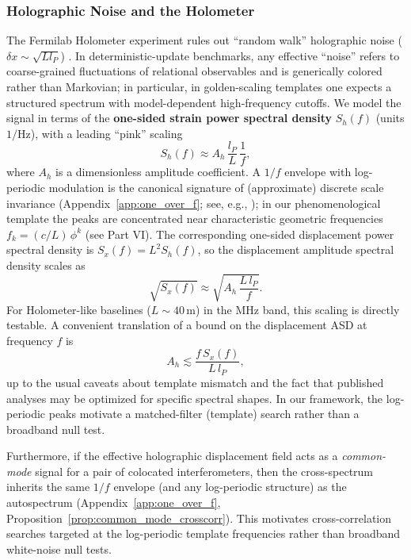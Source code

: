 \subsubsection{Holographic Noise and the Holometer}
The Fermilab Holometer experiment rules out ``random walk'' holographic noise ($\delta x \sim \sqrt{L l_P}$) \cite{Chou2016Holometer}. In deterministic-update benchmarks, any effective ``noise'' refers to coarse-grained fluctuations of relational observables and is generically colored rather than Markovian; in particular, in golden-scaling templates one expects a structured spectrum with model-dependent high-frequency cutoffs.
We model the signal in terms of the \textbf{one-sided strain power spectral density} $S_h(f)$ (units $1/\mathrm{Hz}$), with a leading ``pink'' scaling
\begin{equation}
    S_h(f) \approx A_h\,\frac{l_P}{L}\,\frac{1}{f},
\end{equation}
where $A_h$ is a dimensionless amplitude coefficient. A $1/f$ envelope with log-periodic modulation is the canonical signature of (approximate) discrete scale invariance (Appendix~\ref{app:one_over_f}; see, e.g., \cite{Sornette1998DSI}); in our phenomenological template the peaks are concentrated near characteristic geometric frequencies $f_k = (c/L)\,\phi^k$ (see Part VI). The corresponding one-sided displacement power spectral density is $S_x(f)=L^2 S_h(f)$, so the displacement amplitude spectral density scales as
\begin{equation}
    \sqrt{S_x(f)} \approx \sqrt{A_h\,\frac{L\,l_P}{f}}.
\end{equation}
For Holometer-like baselines ($L\sim 40\,\mathrm{m}$) in the MHz band, this scaling is directly testable. A convenient translation of a bound on the displacement ASD at frequency $f$ is
\begin{equation}
    A_h \lesssim \frac{f\,S_x(f)}{L\,l_P},
\end{equation}
up to the usual caveats about template mismatch and the fact that published analyses may be optimized for specific spectral shapes. In our framework, the log-periodic peaks motivate a matched-filter (template) search rather than a broadband null test.\par
\noindent
Furthermore, if the effective holographic displacement field acts as a \emph{common-mode} signal for a pair of colocated interferometers, then the cross-spectrum inherits the same $1/f$ envelope (and any log-periodic structure) as the autospectrum (Appendix~\ref{app:one_over_f}, Proposition~\ref{prop:common_mode_crosscorr}). This motivates cross-correlation searches targeted at the log-periodic template frequencies rather than broadband white-noise null tests.

